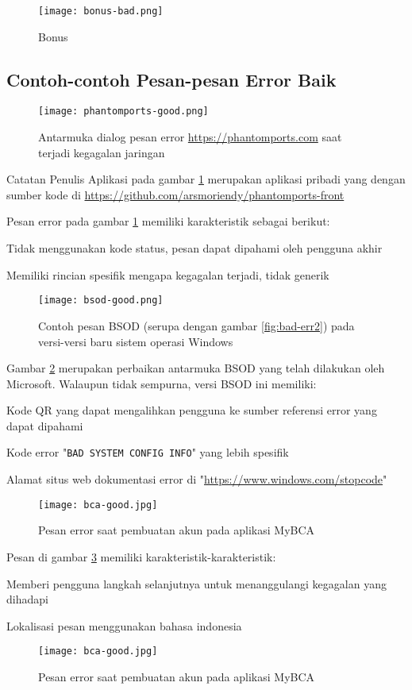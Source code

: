 \begin{figure}[H]
  \centering
  \texttt{[image: bonus-bad.png]}
  \caption{Bonus}
\end{figure}

\subsection{Contoh-contoh Pesan-pesan Error Baik}

\begin{figure}[H]
  \centering
  \texttt{[image: phantomports-good.png]}
  \caption{Antarmuka dialog pesan error
  \url{https://phantomports.com} saat terjadi kegagalan jaringan}
  \label{fig:good-err1}
\end{figure}
\begin{info}{Catatan Penulis}
  Aplikasi pada gambar \ref{fig:good-err1} merupakan aplikasi pribadi
  yang dengan sumber kode di
  \url{https://github.com/arsmoriendy/phantomports-front}
\end{info}
Pesan error pada gambar \ref{fig:good-err1} memiliki karakteristik
sebagai berikut:
\begin{pros}
\item Tidak menggunakan kode status, pesan dapat dipahami oleh pengguna akhir
\item Memiliki rincian spesifik mengapa kegagalan terjadi, tidak generik
\end{pros}

\begin{figure}[H]
  \centering
  \texttt{[image: bsod-good.png]}
  \caption{Contoh pesan BSOD (serupa dengan gambar
  \ref{fig:bad-err2}) pada versi-versi baru sistem operasi Windows}
  \label{fig:good-err2}
\end{figure}
Gambar \ref{fig:good-err2} merupakan perbaikan antarmuka BSOD yang
telah dilakukan oleh Microsoft. Walaupun tidak sempurna, versi BSOD
ini memiliki:
\begin{pros}
\item Kode QR yang dapat mengalihkan pengguna ke sumber referensi
  error yang dapat dipahami
\item Kode error "\texttt{BAD SYSTEM CONFIG INFO}" yang lebih spesifik
\item Alamat situs web dokumentasi error di
  "\url{https://www.windows.com/stopcode}"
\end{pros}

\begin{figure}[H]
  \centering
  \texttt{[image: bca-good.jpg]}
  \caption{Pesan error saat pembuatan akun pada aplikasi MyBCA}
  \label{fig:good-err3}
\end{figure}
Pesan di gambar \ref{fig:good-err3} memiliki karakteristik-karakteristik:
\begin{pros}
\item Memberi pengguna langkah selanjutnya untuk menanggulangi
  kegagalan yang dihadapi
\item Lokalisasi pesan menggunakan bahasa indonesia
\end{pros}

\begin{figure}[H]
  \centering
  \texttt{[image: bca-good.jpg]}
  \caption{Pesan error saat pembuatan akun pada aplikasi MyBCA}
  \label{fig:good-err4}
\end{figure}
